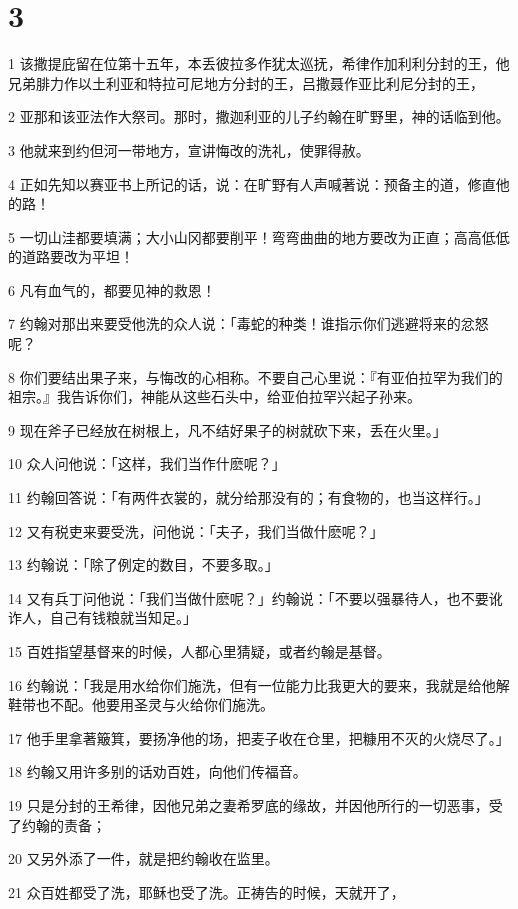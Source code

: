 \chapter{3}

\par 1 该撒提庇留在位第十五年，本丢彼拉多作犹太巡抚，希律作加利利分封的王，他兄弟腓力作以土利亚和特拉可尼地方分封的王，吕撒聂作亚比利尼分封的王，
\par 2 亚那和该亚法作大祭司。那时，撒迦利亚的儿子约翰在旷野里，神的话临到他。
\par 3 他就来到约但河一带地方，宣讲悔改的洗礼，使罪得赦。
\par 4 正如先知以赛亚书上所记的话，说：在旷野有人声喊著说：预备主的道，修直他的路！
\par 5 一切山洼都要填满；大小山冈都要削平！弯弯曲曲的地方要改为正直；高高低低的道路要改为平坦！
\par 6 凡有血气的，都要见神的救恩！
\par 7 约翰对那出来要受他洗的众人说：「毒蛇的种类！谁指示你们逃避将来的忿怒呢？
\par 8 你们要结出果子来，与悔改的心相称。不要自己心里说：『有亚伯拉罕为我们的祖宗。』我告诉你们，神能从这些石头中，给亚伯拉罕兴起子孙来。
\par 9 现在斧子已经放在树根上，凡不结好果子的树就砍下来，丢在火里。」
\par 10 众人问他说：「这样，我们当作什麽呢？」
\par 11 约翰回答说：「有两件衣裳的，就分给那没有的；有食物的，也当这样行。」
\par 12 又有税吏来要受洗，问他说：「夫子，我们当做什麽呢？」
\par 13 约翰说：「除了例定的数目，不要多取。」
\par 14 又有兵丁问他说：「我们当做什麽呢？」约翰说：「不要以强暴待人，也不要讹诈人，自己有钱粮就当知足。」
\par 15 百姓指望基督来的时候，人都心里猜疑，或者约翰是基督。
\par 16 约翰说：「我是用水给你们施洗，但有一位能力比我更大的要来，我就是给他解鞋带也不配。他要用圣灵与火给你们施洗。
\par 17 他手里拿著簸箕，要扬净他的场，把麦子收在仓里，把糠用不灭的火烧尽了。」
\par 18 约翰又用许多别的话劝百姓，向他们传福音。
\par 19 只是分封的王希律，因他兄弟之妻希罗底的缘故，并因他所行的一切恶事，受了约翰的责备；
\par 20 又另外添了一件，就是把约翰收在监里。
\par 21 众百姓都受了洗，耶稣也受了洗。正祷告的时候，天就开了，
